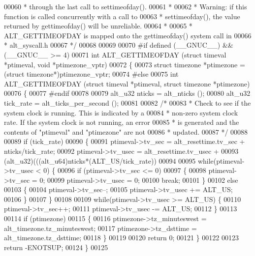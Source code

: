 \begin{DoxyCode}
00060 \textcolor{comment}{ * through the last call to settimeofday().  }
00061 \textcolor{comment}{ *}
00062 \textcolor{comment}{ * Warning: if this function is called concurrently with a call to }
00063 \textcolor{comment}{ * settimeofday(), the value returned by gettimeofday() will be unreliable. }
00064 \textcolor{comment}{ *}
00065 \textcolor{comment}{ * ALT\_GETTIMEOFDAY is mapped onto the gettimeofday() system call in }
00066 \textcolor{comment}{ * alt\_syscall.h}
00067 \textcolor{comment}{ */}
00068  
00069 
00070 \textcolor{preprocessor}{#if defined (\_\_GNUC\_\_) && (\_\_GNUC\_\_ >= 4)}
00071 \textcolor{keywordtype}{int} ALT_GETTIMEOFDAY (\textcolor{keyword}{struct} timeval  *ptimeval, \textcolor{keywordtype}{void} *ptimezone\_vptr)
00072 \{
00073   \textcolor{keyword}{struct }timezone *ptimezone = (\textcolor{keyword}{struct }timezone*)ptimezone\_vptr;
00074 \textcolor{preprocessor}{#else}
00075 \textcolor{keywordtype}{int} ALT_GETTIMEOFDAY (\textcolor{keyword}{struct} timeval  *ptimeval, \textcolor{keyword}{struct} timezone *ptimezone)
00076 \{
00077 \textcolor{preprocessor}{#endif}
00078   
00079   alt_u32 nticks = alt_nticks (); 
00080   alt_u32 tick\_rate = alt_ticks_per_second ();
00081 
00082   \textcolor{comment}{/* }
00083 \textcolor{comment}{   * Check to see if the system clock is running. This is indicated by a }
00084 \textcolor{comment}{   * non-zero system clock rate. If the system clock is not running, an error}
00085 \textcolor{comment}{   * is generated and the contents of "ptimeval" and "ptimezone" are not}
00086 \textcolor{comment}{   * updated.}
00087 \textcolor{comment}{   */}
00088 
00089   \textcolor{keywordflow}{if} (tick\_rate)
00090   \{
00091     ptimeval->tv\_sec  = alt_resettime.tv\_sec  + nticks/tick\_rate;
00092     ptimeval->tv\_usec = alt_resettime.tv\_usec +
00093      (alt_u32)(((alt_u64)nticks*(ALT_US/tick\_rate))%
00094       
00095     \textcolor{keywordflow}{while}(ptimeval->tv\_usec < 0) \{
00096       \textcolor{keywordflow}{if} (ptimeval->tv\_sec <= 0)
00097       \{
00098           ptimeval->tv\_sec = 0;
00099           ptimeval->tv\_usec = 0;
00100           \textcolor{keywordflow}{break};
00101       \}
00102       \textcolor{keywordflow}{else}
00103       \{
00104           ptimeval->tv\_sec--;
00105           ptimeval->tv\_usec += ALT_US;
00106       \}
00107     \}
00108     
00109     \textcolor{keywordflow}{while}(ptimeval->tv\_usec >= ALT_US) \{
00110       ptimeval->tv\_sec++;
00111       ptimeval->tv\_usec -= ALT_US;
00112     \}
00113       
00114     \textcolor{keywordflow}{if} (ptimezone)
00115     \{ 
00116       ptimezone->tz\_minuteswest = alt_timezone.tz\_minuteswest;
00117       ptimezone->tz\_dsttime     = alt_timezone.tz\_dsttime;
00118     \}
00119 
00120     \textcolor{keywordflow}{return} 0;
00121   \}
00122 
00123   \textcolor{keywordflow}{return} -ENOTSUP;
00124 \}
00125 
\end{DoxyCode}
